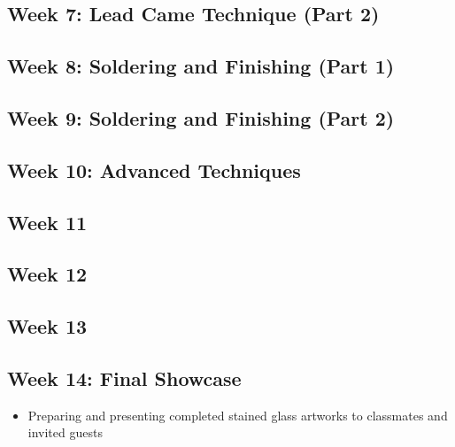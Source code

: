 \documentclass[11pt]{article}
\begin{document}
    \subsection*{Week 7: Lead Came Technique (Part 2)}
    \begin{itemize}

    \end{itemize}

    \subsection*{Week 8: Soldering and Finishing (Part 1)}
    \begin{itemize}

    \end{itemize}

    \subsection*{Week 9: Soldering and Finishing (Part 2)}
    \begin{itemize}

    \end{itemize}

    \subsection*{Week 10: Advanced Techniques}
    \begin{itemize}

    \end{itemize}

    \subsection*{Week 11}
    \begin{itemize}

    \end{itemize}

    \subsection*{Week 12}
    \begin{itemize}

    \end{itemize}

    \subsection*{Week 13}
    \begin{itemize}

    \end{itemize}

    \subsection*{Week 14: Final Showcase}
    \begin{itemize}
        \item Preparing and presenting completed stained glass artworks to classmates and invited guests
    \end{itemize}
\end{document}
